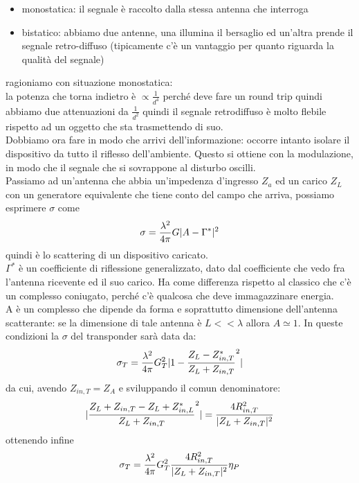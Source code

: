 \documentclass[oneside, 12pt]{extbook}
\DeclarePairedDelimiter{\abs}{\lvert}{\rvert}
\begin{document}
\begin{itemize}
	\item monostatica: il segnale è raccolto dalla stessa antenna che interroga
	\item bistatico: abbiamo due antenne, una illumina il bersaglio ed un'altra prende il segnale retro-diffuso (tipicamente c'è un vantaggio per quanto riguarda la qualità del segnale)
\end{itemize}
ragioniamo con situazione monostatica:\\la potenza che torna indietro è $\propto \frac{1}{d^4}$ perché deve fare un round trip quindi abbiamo due attenuazioni da $\frac{1}{d^2}$ quindi il segnale retrodiffuso è molto flebile rispetto ad un oggetto che sta trasmettendo di suo.\\Dobbiamo ora fare in modo che arrivi dell'informazione: occorre intanto isolare il dispositivo da tutto il riflesso dell'ambiente. Questo si ottiene con la modulazione, in modo che il segnale che si sovrappone al disturbo oscilli.\\Passiamo ad un'antenna che abbia un'impedenza d'ingresso $Z_a$ ed un carico $Z_L$ con un generatore equivalente che tiene conto del campo che arriva, possiamo esprimere $\sigma$ come
\begin{equation}
	\sigma = \frac{\lambda^2}{4 \pi} G \abs{A - \Gamma^*}^2 
\end{equation}
quindi è lo scattering di un dispositivo caricato.\\$\Gamma^*$ è un coefficiente di riflessione generalizzato, dato dal coefficiente che vedo fra l'antenna ricevente ed il suo carico. Ha come differenza rispetto al classico che c'è un complesso coniugato, perché c'è qualcosa che deve immagazzinare energia.\\ A è un complesso che dipende da forma e soprattutto dimensione dell'antenna scatterante: se la dimensione di tale antenna è $L << \lambda$ allora $A \simeq 1$. In queste condizioni la $\sigma$ del transponder sarà data da:
\begin{equation}
	\sigma_T = \frac{\lambda^2}{4\pi}G_T^2 \abs{1 - \dfrac{Z_L - Z_{in,T}^*}{Z_L + Z_{in,T}}^2}
\end{equation}
da cui, avendo $Z_{in,T} = Z_A$ e sviluppando il comun denominatore:
\begin{equation}
	\abs{\dfrac{Z_L + Z_{in,T}-Z_L +Z_{in,L}^*}{Z_L + Z_{in,T}}^2} = \dfrac{4R_{in,T}^2}{\abs{Z_L + Z_{in,T}}^2}
\end{equation}
ottenendo infine
\begin{equation}
	\sigma_T = \frac{\lambda^2}{4 \pi} G_T^2 \dfrac{4R_{in,T}^2}{\abs{Z_L + Z_{in,T}}^2} \eta_P 
\end{equation}
\end{document}
